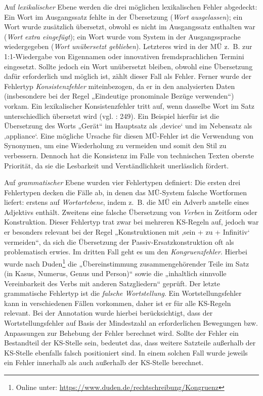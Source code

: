 \largerpage
Auf \textit{lexikalischer} Ebene werden die drei möglichen lexikalischen Fehler abgedeckt: Ein Wort im Ausgangssatz fehlte in der Übersetzung (\textit{Wort ausgelassen}); ein Wort wurde zusätzlich übersetzt, obwohl es nicht im Ausgangssatz enthalten war (\textit{Wort extra eingefügt}); ein Wort wurde vom System in der Ausgangssprache wiedergegeben (\textit{Wort unübersetzt geblieben}). Letzteres wird in der MÜ z.~B. zur 1:1-Wiedergabe von Eigennamen oder innovativen fremdsprachlichen Termini eingesetzt. Sollte jedoch ein Wort unübersetzt bleiben, obwohl eine Übersetzung dafür erforderlich und möglich ist, zählt dieser Fall als Fehler. Ferner wurde der Fehlertyp \textit{Konsistenzfehler} miteinbezogen, da er in den analysierten Daten (insbesondere bei der Regel „Eindeutige pronominale Bezüge verwenden“) vorkam. Ein lexikalischer Konsistenzfehler tritt auf, wenn dasselbe Wort im Satz unterschiedlich übersetzt wird (vgl. \citealt{Mertin2006}: 249). Ein Beispiel hierfür ist die Übersetzung des Worts „Gerät“ im Hauptsatz als ‚device‘ und im Nebensatz als ‚appliance‘. Eine mögliche Ursache für diesen MÜ-Fehler ist die Verwendung von Synonymen, um eine Wiederholung zu vermeiden und somit den Stil zu verbessern. Dennoch hat die Konsistenz im Falle von technischen Texten oberste Priorität, da sie die Lesbarkeit und Verständlichkeit unerlässlich fördert.

Auf \textit{grammatischer} Ebene wurden vier Fehlertypen definiert: Die ersten drei Fehlertypen decken die Fälle ab, in denen das MÜ-System falsche Wortformen liefert: erstens auf \textit{Wortartebene}, indem z.~B. die MÜ ein Adverb anstelle eines Adjektivs enthält. Zweitens eine falsche Übersetzung von \textit{Verben} in Zeitform oder Konstruktion. Dieser Fehlertyp trat zwar bei mehreren KS-Regeln auf, jedoch war er besonders relevant bei der Regel „Konstruktionen mit ‚sein + zu + Infinitiv‘ vermeiden“, da sich die Übersetzung der Passiv-Ersatzkonstruktion oft als problematisch erwies. Im dritten Fall geht es um den \textit{Kongruenzfehler}. Hierbei wurde nach Duden\footnote{{{{Online unter: \url{https://www.duden.de/rechtschreibung/Kongruenz}}}}} die „Übereinstimmung zusammengehörender Teile im Satz (in Kasus, Numerus, Genus und Person)“ sowie die „inhaltlich sinnvolle Vereinbarkeit des Verbs mit anderen Satzgliedern“ geprüft. Der letzte grammatische Fehlertyp ist die \textit{falsche Wortstellung}. Ein Wortstellungsfehler kann in verschiedenen Fällen vorkommen, daher ist er für alle KS-Regeln relevant. Bei der Annotation wurde hierbei berücksichtigt, dass der Wortstellungsfehler auf Basis der Mindestzahl an erforderlichen Bewegungen bzw. Anpassungen zur Behebung der Fehler berechnet wird. Sollte der Fehler ein Bestandteil der KS-Stelle sein, bedeutet das, dass weitere Satzteile außerhalb der KS-Stelle ebenfalls falsch positioniert sind. In einem solchen Fall wurde jeweils ein Fehler innerhalb als auch außerhalb der KS-Stelle berechnet.


